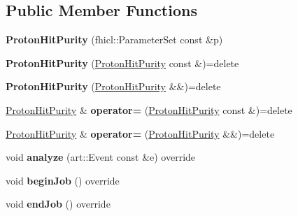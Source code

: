 \subsection*{Public Member Functions}
\begin{DoxyCompactItemize}
\item 
{\bfseries Proton\+Hit\+Purity} (fhicl\+::\+Parameter\+Set const \&p)\hypertarget{classProtonHitPurity_abe7eb14746a7e1555142a2f97dd6c8a7}{}\label{classProtonHitPurity_abe7eb14746a7e1555142a2f97dd6c8a7}

\item 
{\bfseries Proton\+Hit\+Purity} (\hyperlink{classProtonHitPurity}{Proton\+Hit\+Purity} const \&)=delete\hypertarget{classProtonHitPurity_a30e40f4da9dd297a45af8453698365be}{}\label{classProtonHitPurity_a30e40f4da9dd297a45af8453698365be}

\item 
{\bfseries Proton\+Hit\+Purity} (\hyperlink{classProtonHitPurity}{Proton\+Hit\+Purity} \&\&)=delete\hypertarget{classProtonHitPurity_a5893503a8818f9e2b060529ff01c5643}{}\label{classProtonHitPurity_a5893503a8818f9e2b060529ff01c5643}

\item 
\hyperlink{classProtonHitPurity}{Proton\+Hit\+Purity} \& {\bfseries operator=} (\hyperlink{classProtonHitPurity}{Proton\+Hit\+Purity} const \&)=delete\hypertarget{classProtonHitPurity_a79ea93f2e5ee376569b3db012f90bf72}{}\label{classProtonHitPurity_a79ea93f2e5ee376569b3db012f90bf72}

\item 
\hyperlink{classProtonHitPurity}{Proton\+Hit\+Purity} \& {\bfseries operator=} (\hyperlink{classProtonHitPurity}{Proton\+Hit\+Purity} \&\&)=delete\hypertarget{classProtonHitPurity_af5c3fb096ec529ada9dbdb69ce78053f}{}\label{classProtonHitPurity_af5c3fb096ec529ada9dbdb69ce78053f}

\item 
void {\bfseries analyze} (art\+::\+Event const \&e) override\hypertarget{classProtonHitPurity_a39595f8fc8677b6b95ce467f685ee276}{}\label{classProtonHitPurity_a39595f8fc8677b6b95ce467f685ee276}

\item 
void {\bfseries begin\+Job} () override\hypertarget{classProtonHitPurity_a6838668a5d854bd257375d1a437278ee}{}\label{classProtonHitPurity_a6838668a5d854bd257375d1a437278ee}

\item 
void {\bfseries end\+Job} () override\hypertarget{classProtonHitPurity_accac7c769c035cb43c9d6e5a780ab241}{}\label{classProtonHitPurity_accac7c769c035cb43c9d6e5a780ab241}

\end{DoxyCompactItemize}
